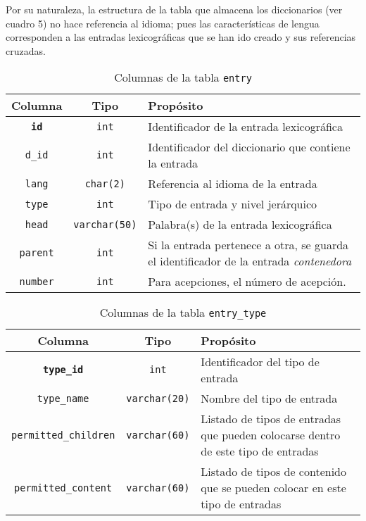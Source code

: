 \documentclass[11pt]{article} %
\begin{document}
Por su naturaleza, la estructura de la tabla que almacena los diccionarios (ver cuadro 5) no hace referencia al idioma; pues las características de lengua corresponden a las entradas lexicográficas que se han ido creado y sus referencias cruzadas.


\begin{table}
\centering
\begin{tabular}{ccp{6cm}} 
\toprule 
Columna & Tipo &Propósito \\ \midrule 
\texttt{\bf id} &\texttt{int} & Identificador de la entrada lexicográfica \\ 
\texttt{d\_id} & \texttt{int} &Identificador del diccionario que contiene la entrada \\
\texttt{lang} & \texttt{char(2)} & Referencia al idioma de la entrada\\ 
\texttt{type} & \texttt{int} & Tipo de entrada y nivel jerárquico \\ 
\texttt{head} & \texttt{varchar(50)} & Palabra(s) de la entrada lexicográfica \\ 
\texttt{parent} & \texttt{int} & Si la entrada pertenece a otra,  se guarda el identificador de la entrada \textit{contenedora} \\
\texttt{number} & \texttt{int} & Para acepciones, el número de acepción. \\ 
\bottomrule 
\end{tabular}
\caption{Columnas de la tabla \texttt{entry}}
\end{table}

\begin{table}
\centering
\begin{tabular}{ccp{6cm}} 
\toprule 
Columna & Tipo &Propósito \\ \midrule 
\texttt{\bf type\_id} &\texttt{int} & Identificador del tipo de entrada \\ 
\texttt{type\_name} & \texttt{varchar(20)} & Nombre del tipo de entrada \\ 
\texttt{permitted\_children} & \texttt{varchar(60)} & Listado de tipos de entradas que pueden colocarse dentro de este tipo de entradas \\
\texttt{permitted\_content} & \texttt{varchar(60)} & Listado de tipos de contenido que se pueden colocar en este tipo de entradas \\ 
\bottomrule 
\end{tabular}
\caption{Columnas de la tabla \texttt{entry\_type}}
\end{table}
\end{document}
